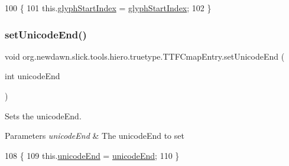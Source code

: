 \begin{DoxyCode}
100                                                         \{
101         this.\mbox{\hyperlink{classorg_1_1newdawn_1_1slick_1_1tools_1_1hiero_1_1truetype_1_1_t_t_f_cmap_entry_ad7d0da37875efc20244b93ad930d73ad}{glyphStartIndex}} = \mbox{\hyperlink{classorg_1_1newdawn_1_1slick_1_1tools_1_1hiero_1_1truetype_1_1_t_t_f_cmap_entry_ad7d0da37875efc20244b93ad930d73ad}{glyphStartIndex}};
102     \}
\end{DoxyCode}
\mbox{\label{classorg_1_1newdawn_1_1slick_1_1tools_1_1hiero_1_1truetype_1_1_t_t_f_cmap_entry_af8219c9254aeaf7c6389d9680ca0b288}} 
\subsubsection{\texorpdfstring{set\+Unicode\+End()}{setUnicodeEnd()}}
{\footnotesize\ttfamily void org.\+newdawn.\+slick.\+tools.\+hiero.\+truetype.\+T\+T\+F\+Cmap\+Entry.\+set\+Unicode\+End (\begin{DoxyParamCaption}\item[{int}]{unicode\+End }\end{DoxyParamCaption})\hspace{0.3cm}{\ttfamily [inline]}}

Sets the unicode\+End. 
\begin{DoxyParams}{Parameters}
{\em unicode\+End} & The unicode\+End to set \\
\hline
\end{DoxyParams}

\begin{DoxyCode}
108                                               \{
109         this.\mbox{\hyperlink{classorg_1_1newdawn_1_1slick_1_1tools_1_1hiero_1_1truetype_1_1_t_t_f_cmap_entry_acffa8eba3c1a7ba50e48c20edbc176b6}{unicodeEnd}} = \mbox{\hyperlink{classorg_1_1newdawn_1_1slick_1_1tools_1_1hiero_1_1truetype_1_1_t_t_f_cmap_entry_acffa8eba3c1a7ba50e48c20edbc176b6}{unicodeEnd}};
110     \}
\end{DoxyCode}
\mbox{\label{classorg_1_1newdawn_1_1slick_1_1tools_1_1hiero_1_1truetype_1_1_t_t_f_cmap_entry_ac6d09deb166294bd1e4a0f901e992bcf}} 
